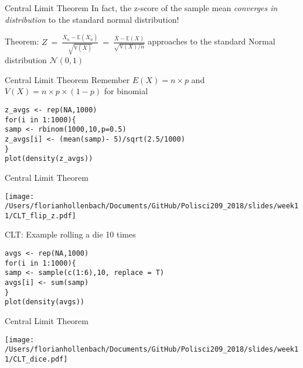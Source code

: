 \documentclass[presentation]{beamer}
\newcommand{\E}{\mathbb{E}}
\newcommand{\V}{\mathbb{V}}
\begin{document}
\begin{frame}[label={sec:org5783888}]{Central Limit Theorem}
In fact, the z-score of the sample mean \emph{converges in distribution} to the standard normal distribution!

\alert{Theorem}:
\(Z \ = \ \frac{\overline{X}_n -
      \E(\overline{X}_n)}{\sqrt{\V(\overline{X})}} \ = \
    \frac{\overline{X} - \E(X)}{\sqrt{\V(X)/n}}\)
    approaches to the standard Normal distribution \(\mathcal{N}(0,1)\)
\end{frame}


\begin{frame}[fragile,label={sec:org2116ef5}]{Central Limit Theorem}
 Remember \(E(X) = n \times p\) and \(V(X) = n \times p \times (1-p)\) for binomial


\begin{verbatim}
z_avgs <- rep(NA,1000)
for(i in 1:1000){
samp <- rbinom(1000,10,p=0.5)
z_avgs[i] <- (mean(samp)- 5)/sqrt(2.5/1000)
}
plot(density(z_avgs))
\end{verbatim}
\end{frame}

\begin{frame}[label={sec:org811ebef}]{Central Limit Theorem}
\begin{center}
\texttt{[image: /Users/florianhollenbach/Documents/GitHub/Polisci209\_2018/slides/week11/CLT\_flip\_z.pdf]}
\end{center}
\end{frame}


\begin{frame}[fragile,label={sec:orgaf965d7}]{CLT: Example rolling a die 10 times}
 \begin{verbatim}
avgs <- rep(NA,1000)
for(i in 1:1000){
samp <- sample(c(1:6),10, replace = T)
avgs[i] <- sum(samp)
}
plot(density(avgs))
\end{verbatim}
\end{frame}


\begin{frame}[label={sec:orge65705c}]{Central Limit Theorem}
\begin{center}
\texttt{[image: /Users/florianhollenbach/Documents/GitHub/Polisci209\_2018/slides/week11/CLT\_dice.pdf]}
\end{center}
\end{frame}
\end{document}
